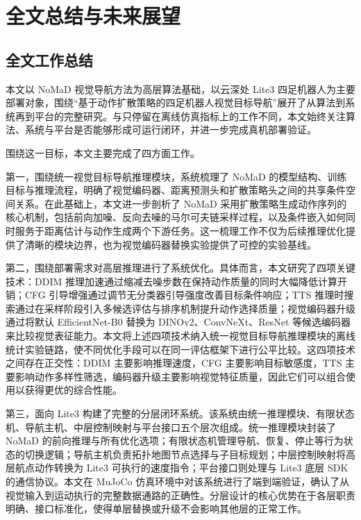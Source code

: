 ﻿%

\chapter{全文总结与未来展望}

\section{全文工作总结}

本文以 NoMaD 视觉导航方法为高层算法基础，以云深处 Lite3 四足机器人为主要部署对象，围绕``基于动作扩散策略的四足机器人视觉目标导航''展开了从算法到系统再到平台的完整研究。与只停留在离线仿真指标上的工作不同，本文始终关注算法、系统与平台是否能够形成可运行闭环，并进一步完成真机部署验证。

围绕这一目标，本文主要完成了四方面工作。

第一，围绕统一视觉目标导航推理模块，系统梳理了 NoMaD\cite{nomad2023} 的模型结构、训练目标与推理流程，明确了视觉编码器、距离预测头和扩散策略头之间的共享条件空间关系。在此基础上，本文进一步剖析了 NoMaD 采用扩散策略生成动作序列的核心机制，包括前向加噪、反向去噪的马尔可夫链采样过程，以及条件嵌入如何同时服务于距离估计与动作生成两个下游任务。这一梳理工作不仅为后续推理优化提供了清晰的模块边界，也为视觉编码器替换实验提供了可控的实验基线。

第二，围绕部署需求对高层推理进行了系统优化。具体而言，本文研究了四项关键技术：DDIM 推理加速通过缩减去噪步数在保持动作质量的同时大幅降低计算开销；CFG 引导增强通过调节无分类器引导强度改善目标条件响应；TTS 推理时搜索通过在采样阶段引入多候选评估与排序机制提升动作选择质量；视觉编码器升级通过将默认 EfficientNet-B0 替换为 DINOv2、ConvNeXt、ResNet 等候选编码器来比较视觉表征能力。本文将上述四项技术纳入统一视觉目标导航推理模块的离线统计实验链路，使不同优化手段可以在同一评估框架下进行公平比较。这四项技术之间存在正交性：DDIM 主要影响推理速度，CFG 主要影响目标敏感度，TTS 主要影响动作多样性筛选，编码器升级主要影响视觉特征质量，因此它们可以组合使用以获得更优的综合性能。

第三，面向 Lite3 构建了完整的分层闭环系统。该系统由统一推理模块、有限状态机、导航主机、中层控制映射与平台接口五个层次组成。统一推理模块封装了 NoMaD 的前向推理与所有优化选项；有限状态机管理导航、恢复、停止等行为状态的切换逻辑；导航主机负责拓扑地图节点选择与子目标规划；中层控制映射将高层航点动作转换为 Lite3 可执行的速度指令；平台接口则处理与 Lite3 底层 SDK 的通信协议。本文在 MuJoCo 仿真环境中对该系统进行了端到端验证，确认了从视觉输入到运动执行的完整数据通路的正确性。分层设计的核心优势在于各层职责明确、接口标准化，使得单层替换或升级不会影响其他层的正常工作。

